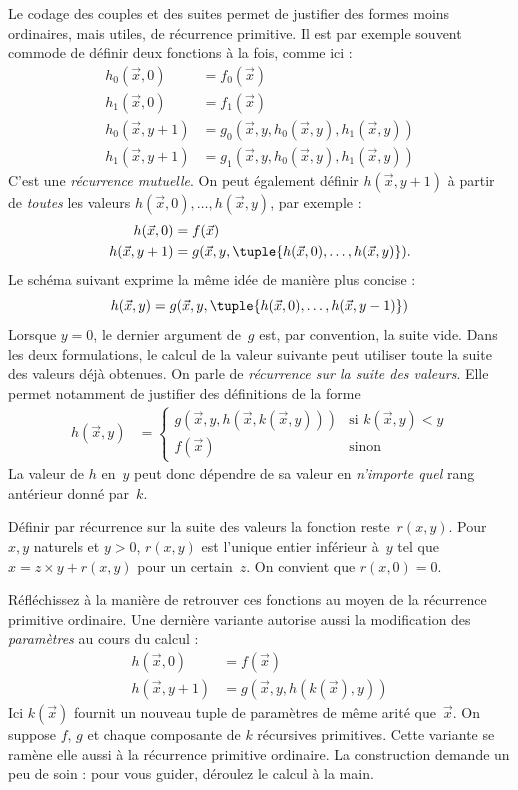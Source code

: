 \documentclass[../../../include/open-logic-section]{subfiles}
\begin{document}

Le codage des couples et des suites permet de justifier des
formes moins ordinaires, mais utiles, de récurrence primitive.
Il est par exemple souvent commode de définir deux fonctions
à la fois, comme ici :
\begin{align*}
h_0(\vec x, 0) & = f_0(\vec x) \\
h_1(\vec x, 0) & = f_1(\vec x) \\
h_0(\vec x, y+1) & = g_0(\vec x, y, h_0(\vec x, y), h_1(\vec x, y)) \\
h_1(\vec x, y+1) & = g_1(\vec x, y, h_0(\vec x, y), h_1(\vec x, y))
\end{align*}
C'est une \emph{récurrence mutuelle}. On peut également
définir $h(\vec x,y+1)$ à partir de \emph{toutes} les valeurs
$h(\vec x,0),\dots,h(\vec x,y)$, par exemple :
\begin{align*}
h(\vec x, 0) & = f(\vec x) \\
h(\vec x, y+1) & = g(\vec x, y, \tuple{h(\vec x, 0), \dots, h(\vec x, y)}).
\end{align*}
Le schéma suivant exprime la même idée de manière plus concise :
\[
h(\vec x, y) = g(\vec x, y, \tuple{h(\vec x, 0), \dots, h(\vec x, y-1)})
\]
Lorsque $y=0$, le dernier argument de~$g$ est, par
convention, la suite vide. Dans les deux formulations, le
calcul de la valeur suivante peut utiliser toute la suite
des valeurs déjà obtenues. On parle de \emph{récurrence
sur la suite des valeurs}. Elle permet notamment de
justifier des définitions de la forme
\begin{align*}
h(\vec x, y) & = \begin{cases}
  g(\vec x, y, h(\vec x, k(\vec x, y))) & \text{si $k(\vec x, y) < y$} \\
  f(\vec x) & \text{sinon}
\end{cases}
\end{align*}
La valeur de $h$ en~$y$ peut donc dépendre de sa valeur
en \emph{n'importe quel} rang antérieur donné par~$k$.

\begin{prob}
  Définir par récurrence sur la suite des valeurs la fonction
  reste~$r(x,y)$. Pour $x,y$ naturels et $y>0$, $r(x,y)$
  est l'unique entier inférieur à~$y$ tel que
  $x=z\times y+r(x,y)$ pour un certain~$z$.
  On convient que $r(x,0)=0$.
\end{prob}

Réfléchissez à la manière de retrouver ces fonctions au
moyen de la récurrence primitive ordinaire. Une dernière
variante autorise aussi la modification des
\emph{paramètres} au cours du calcul :
\begin{align*}
h(\vec x, 0) & = f(\vec x) \\
h(\vec x, y+1) & = g(\vec x, y, h(k(\vec x), y))
\end{align*}
Ici $k(\vec x)$ fournit un nouveau tuple de paramètres de
même arité que~$\vec x$. On suppose $f$, $g$ et chaque composante de $k$ récursives primitives.
Cette variante se ramène elle aussi à la récurrence primitive ordinaire. La construction demande
un peu de soin : pour vous guider, déroulez le calcul à la main.
\end{document}

